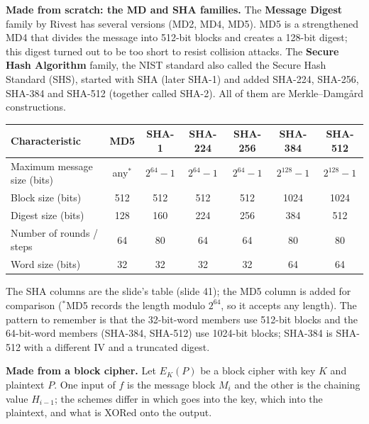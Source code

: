 \textbf{Made from scratch: the MD and SHA families.} The \textbf{Message Digest} family by Rivest has several versions (MD2, MD4, MD5). MD5 is a strengthened MD4 that divides the message into 512-bit blocks and creates a 128-bit digest; this digest turned out to be too short to resist collision attacks. The \textbf{Secure Hash Algorithm} family, the NIST standard also called the Secure Hash Standard (SHS), started with SHA (later SHA-1) and added SHA-224, SHA-256, SHA-384 and SHA-512 (together called SHA-2). All of them are Merkle--Damg\aa rd constructions.
\begin{center}\small
\begin{tabular}{@{}lcccccc@{}}
\toprule
Characteristic & MD5 & SHA-1 & SHA-224 & SHA-256 & SHA-384 & SHA-512\\
\midrule
Maximum message size (bits) & any$^{*}$ & $2^{64} - 1$ & $2^{64} - 1$ & $2^{64} - 1$ & $2^{128} - 1$ & $2^{128} - 1$\\
Block size (bits) & 512 & 512 & 512 & 512 & 1024 & 1024\\
Digest size (bits) & 128 & 160 & 224 & 256 & 384 & 512\\
Number of rounds / steps & 64 & 80 & 64 & 64 & 80 & 80\\
Word size (bits) & 32 & 32 & 32 & 32 & 64 & 64\\
\bottomrule
\end{tabular}
\end{center}
The SHA columns are the slide's table (slide 41); the MD5 column is added for comparison ($^{*}$MD5 records the length modulo $2^{64}$, so it accepts any length). The pattern to remember is that the 32-bit-word members use 512-bit blocks and the 64-bit-word members (SHA-384, SHA-512) use 1024-bit blocks; SHA-384 is SHA-512 with a different IV and a truncated digest.

\textbf{Made from a block cipher.} Let $E_K(P)$ be a block cipher with key $K$ and plaintext $P$. One input of $f$ is the message block $M_i$ and the other is the chaining value $H_{i-1}$; the schemes differ in which goes into the key, which into the plaintext, and what is XORed onto the output.

